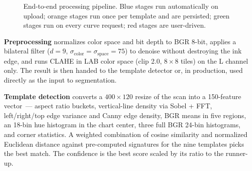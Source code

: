 \documentclass[a4paper,12pt]{report}
\begin{document}
\begin{figure}[h!]
\centering
{}
\caption{End-to-end processing pipeline. Blue stages run automatically on upload; orange stages run once per template and are persisted; green stages run on every curve request; red stages are user-driven.}
\label{fig:pipeline}
\end{figure}

\textbf{Preprocessing} normalizes color space and bit depth to BGR 8-bit, applies a bilateral filter ($d=9$, $\sigma_{\text{color}}=\sigma_{\text{space}}=75$) to denoise without destroying the ink edge, and runs CLAHE in LAB color space (clip 2.0, $8{\times}8$ tiles) on the L channel only. The result is then handed to the template detector or, in production, used directly as the input to segmentation.

\textbf{Template detection} converts a $400\times120$ resize of the scan into a 150-feature vector~--- aspect ratio buckets, vertical-line density via Sobel + FFT, left/right/top edge variance and Canny edge density, BGR means in five regions, an 18-bin hue histogram in the chart center, three full BGR 24-bin histograms, and corner statistics. A weighted combination of cosine similarity and normalized Euclidean distance against pre-computed signatures for the nine templates picks the best match. The confidence is the best score scaled by its ratio to the runner-up.
\end{document}
